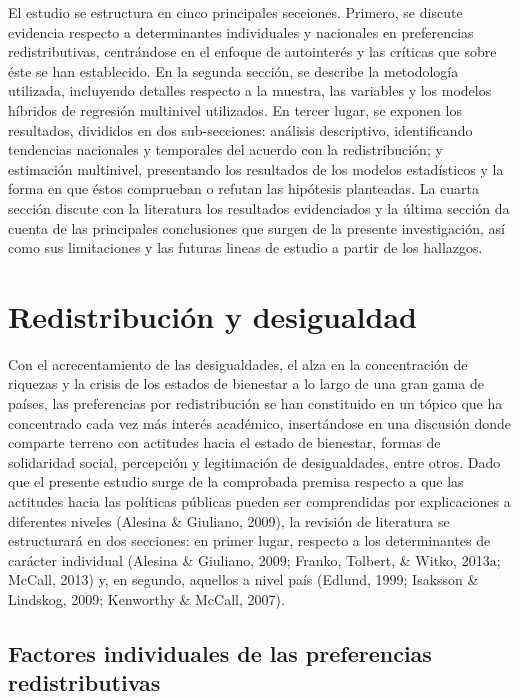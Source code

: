 \documentclass[12pt,letterpaper]{article}
\begin{document}
El estudio se estructura en cinco principales secciones. Primero, se discute evidencia respecto a determinantes individuales y nacionales en preferencias redistributivas, centrándose en el enfoque de autointerés y las críticas que sobre éste se han establecido. En la segunda sección, se describe la metodología utilizada, incluyendo detalles respecto a la muestra, las variables y los modelos híbridos de regresión multinivel utilizados. En tercer lugar, se exponen los resultados, divididos en dos sub-secciones: análisis descriptivo, identificando tendencias nacionales y temporales del acuerdo con la redistribución; y estimación multinivel, presentando los resultados de los modelos estadísticos y la forma en que éstos comprueban o refutan las hipótesis planteadas. La cuarta sección discute con la literatura los resultados evidenciados y la última sección da cuenta de las principales conclusiones que surgen de la presente investigación, así como sus limitaciones y las futuras lineas de estudio a partir de los hallazgos. 

\newpage

\section{Redistribución y desigualdad \label{sec:sec2}}

Con el acrecentamiento de las desigualdades, el alza en la concentración de riquezas y la crisis de los estados de bienestar a lo largo de una gran gama de países, las preferencias por redistribución se han constituido en un tópico que ha concentrado cada vez más interés académico, insertándose en una discusión donde comparte terreno con actitudes hacia el estado de bienestar, formas de solidaridad social, percepción y legitimación de desigualdades, entre otros. Dado que el presente estudio surge de la comprobada premisa respecto a que las actitudes hacia las políticas públicas pueden ser comprendidas por explicaciones a diferentes niveles (Alesina \& Giuliano, 2009), la revisión de literatura se estructurará en dos secciones: en primer lugar, respecto a los determinantes de carácter individual (Alesina \& Giuliano, 2009; Franko, Tolbert, \& Witko, 2013a; McCall, 2013) y, en segundo, aquellos a nivel país (Edlund, 1999; Isaksson \& Lindskog, 2009; Kenworthy \& McCall, 2007).

\subsection{Factores individuales de las preferencias redistributivas \label{sec:sec21}}
\end{document}
